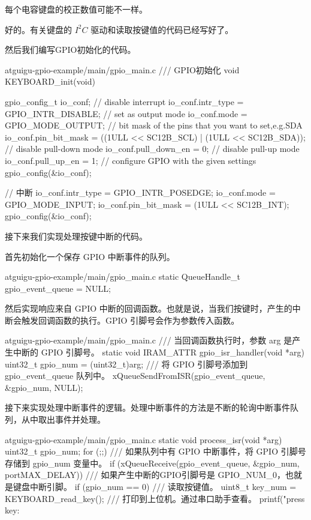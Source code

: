\documentclass[lang=cn,newtx,10pt,scheme=chinese]{elegantbook}
\begin{document}
\begin{marker}
每个电容键盘的校正数值可能不一样。
\end{marker}

好的。有关键盘的 $I^2C$ 驱动和读取按键值的代码已经写好了。

然后我们编写GPIO初始化的代码。

\begin{mycode}{atguigu-gpio-example/main/gpio\_main.c}
/// GPIO初始化
void KEYBOARD_init(void)
{
    gpio_config_t io_conf;
    // disable interrupt
    io_conf.intr_type = GPIO_INTR_DISABLE;
    // set as output mode
    io_conf.mode = GPIO_MODE_OUTPUT;
    // bit mask of the pins that you want to set,e.g.SDA
    io_conf.pin_bit_mask = ((1ULL << SC12B_SCL) | (1ULL << SC12B_SDA));
    // disable pull-down mode
    io_conf.pull_down_en = 0;
    // disable pull-up mode
    io_conf.pull_up_en = 1;
    // configure GPIO with the given settings
    gpio_config(&io_conf);

    // 中断
    io_conf.intr_type = GPIO_INTR_POSEDGE;
    io_conf.mode = GPIO_MODE_INPUT;
    io_conf.pin_bit_mask = (1ULL << SC12B_INT);
    gpio_config(&io_conf);
}
\end{mycode}

接下来我们实现处理按键中断的代码。

首先初始化一个保存 GPIO 中断事件的队列。

\begin{mycode}{atguigu-gpio-example/main/gpio\_main.c}
static QueueHandle_t gpio_event_queue = NULL;
\end{mycode}

然后实现响应来自 GPIO 中断的回调函数。也就是说，当我们按键时，产生的中断会触发回调函数的执行。GPIO 引脚号会作为参数传入函数。

\begin{mycode}{atguigu-gpio-example/main/gpio\_main.c}
/// 当回调函数执行时，参数 arg 是产生中断的 GPIO 引脚号。
static void IRAM_ATTR gpio_isr_handler(void *arg)
{
    uint32_t gpio_num = (uint32_t)arg;
    /// 将 GPIO 引脚号添加到 gpio_event_queue 队列中。
    xQueueSendFromISR(gpio_event_queue, &gpio_num, NULL);
}
\end{mycode}

接下来实现处理中断事件的逻辑。处理中断事件的方法是不断的轮询中断事件队列，从中取出事件并处理。

\begin{mycode}{atguigu-gpio-example/main/gpio\_main.c}
static void process_isr(void *arg)
{
    uint32_t gpio_num;
    for (;;)
    {
        /// 如果队列中有 GPIO 中断事件，将 GPIO 引脚号存储到 gpio_num 变量中。
        if (xQueueReceive(gpio_event_queue, &gpio_num, portMAX_DELAY))
        {
            /// 如果产生中断的GPIO引脚号是 GPIO_NUM_0，也就是键盘中断引脚。
            if (gpio_num == 0)
            {
                /// 读取按键值。
                uint8_t key_num = KEYBOARD_read_key();
                /// 打印到上位机。通过串口助手查看。
                printf("press key: %
            }
        }
    }
}
\end{mycode}
\end{document}
